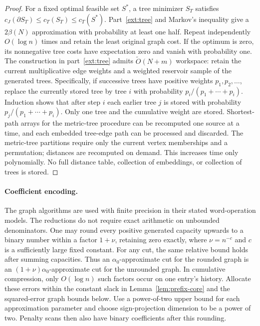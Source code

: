 \documentclass[11pt]{article}
\theoremstyle{definition}
\newcommand{\wt}{\widetilde}
\newcommand{\cut}{\partial}
\begin{document}
\begin{proof}
For a fixed optimal feasible set $S^*$, a tree minimizer $S_T$ satisfies
$c_J(\cut S_T)\le c_T(S_T)\le c_T(S^*)$. Part~\ref{ext:tree} and Markov's
inequality give a $2\beta(N)$ approximation with probability at least
one half. Repeat independently $O(\log n)$ times and retain the least
original graph cost. If the optimum is zero, its nonnegative tree costs
have expectation zero and vanish with probability one.
The construction in part~\ref{ext:tree} admits $\wt O(N+m)$ workspace:
retain the current multiplicative edge weights and a weighted reservoir
sample of the generated trees. Specifically, if successive trees have
positive weights $p_1,p_2,\ldots$, replace the currently stored tree by tree $i$
with probability $p_i/(p_1+\cdots+p_i)$. Induction shows that after step
$i$ each earlier tree $j$ is stored with probability
$p_j/(p_1+\cdots+p_i)$. Only one tree and the cumulative weight are
stored. Shortest-path arrays for the metric-tree
procedure can be recomputed one source at a time, and each embedded tree-edge
path can be processed and discarded. The metric-tree partitions require
only the current vertex memberships and a permutation; distances are
recomputed on demand. This increases time only polynomially. No full
distance table, collection of embeddings, or collection of trees is stored.
\end{proof}

\paragraph{Coefficient encoding.}
The graph algorithms are used with finite precision in their stated
word-operation models. The reductions do not require exact arithmetic on
unbounded denominators. One may round every positive generated capacity
upwards to a binary number within a factor $1+\nu$, retaining zero
exactly, where $\nu=n^{-c}$ and $c$ is a sufficiently large fixed constant.
For any cut, the same relative bound holds after summing capacities.
Thus an $\alpha_0$-approximate cut for the rounded graph is an
$(1+\nu)\alpha_0$-approximate cut for the unrounded graph.
In cumulative compression, only $O(\log n)$ such factors occur on one
entry's history. Allocate these errors within the constant slack in
Lemma~\ref{lem:prefix-core} and the squared-error graph bounds below.
Use a power-of-two upper bound for each approximation parameter and
choose sign-projection dimension to be a power of two. Penalty scans
then also have binary coefficients after this rounding.
\end{document}
